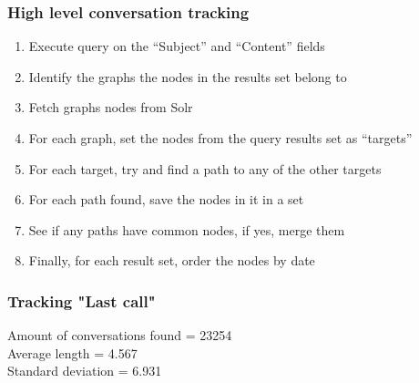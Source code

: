 \documentclass{beamer}
\begin{document}
\begin{frame}
\frametitle{High level conversation tracking}

\begin{enumerate}
\item Execute query on the “Subject” and “Content” fields
\item Identify the graphs the nodes in the results set belong to 
\item Fetch graphs nodes from Solr
\item For each graph, set the nodes from the query results set as “targets”
\item For each target, try and find a path to any of the other targets
\item For each path found, save the nodes in it in a set 
\item See if any paths have common nodes, if yes, merge them 
\item Finally, for each result set, order the nodes by date


\end{enumerate}


\end{frame}


\begin{frame}

\frametitle{Tracking "Last call"}

Amount of conversations found = 23254\\
Average length = 4.567\\
Standard deviation = 6.931\\

\end{frame}
\end{document}
